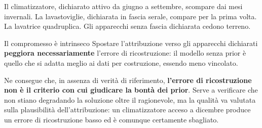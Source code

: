 Il climatizzatore, dichiarato attivo da giugno a settembre, scompare dai mesi invernali. La
lavastoviglie, dichiarata in fascia serale, compare per la prima volta. La lavatrice quadruplica.
Gli apparecchi senza fascia dichiarata cedono terreno.

\begin{warnbox}{Il compromesso è intrinseco}
Spostare l'attribuzione verso gli apparecchi dichiarati \textbf{peggiora necessariamente} l'errore
di ricostruzione: il modello senza prior è quello che si adatta meglio ai dati per costruzione,
essendo meno vincolato.

Ne consegue che, in assenza di verità di riferimento, \textbf{l'errore di ricostruzione non è il
criterio con cui giudicare la bontà dei prior}. Serve a verificare che non stiano degradando la
soluzione oltre il ragionevole, ma la qualità va valutata sulla plausibilità dell'attribuzione: un
climatizzatore acceso a dicembre produce un errore di ricostruzione basso ed è comunque
certamente sbagliato.
\end{warnbox}
